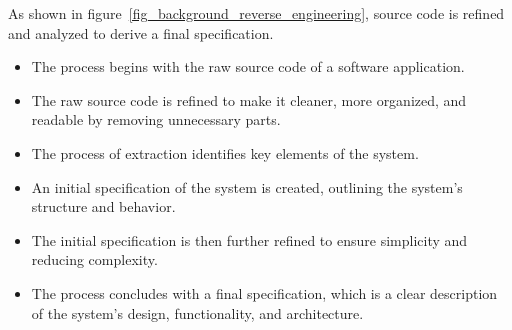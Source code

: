 As shown in figure~\ref{fig_background_reverse_engineering}, source code is refined and analyzed to derive a final specification.

\begin{itemize}
    \item The process begins with the raw source code of a software application.
    \item The raw source code is refined to make it cleaner, more organized, and readable by removing unnecessary parts.
    \item The process of extraction identifies key elements of the system.
    \item An initial specification of the system is created, outlining the system's structure and behavior.
    \item The initial specification is then further refined to ensure simplicity and reducing complexity.
    \item The process concludes with a final specification, which is a clear description of the system's design, functionality, and architecture.
\end{itemize}